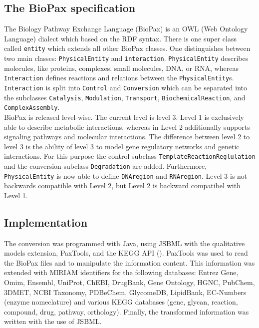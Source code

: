 \documentclass{bioinfo}
\begin{document}
\begin{methods}
\subsection{The BioPax specification}
The Biology Pathway Exchange Language (BioPax) is an OWL (Web Ontology Language) dialect which based on the RDF syntax.
There is one super class called \texttt{entity} which extends all other BioPax classes.
One distinguishes between two main classes: \texttt{PhysicalEntity} and \texttt{interaction}.
\texttt{PhysicalEntity} describes molecules, like proteins, complexes, small molecules, DNA, or RNA, whereas \texttt{Interaction} defines reactions and relations between the \texttt{PhysicalEntity}s.
\texttt{Interaction} is split into \texttt{Control} and \texttt{Conversion} which can be separated into the subclasses \texttt{Catalysis}, \texttt{Modulation}, \texttt{Transport}, \texttt{BiochemicalReaction}, and \texttt{Complex\-Assembly}.\\
BioPax is released level-wise.
The current level is level 3.
Level 1 is exclusively able to describe metabolic interactions, whereas in Level 2 additionally supports signaling pathways and molecular interactions.
The difference between level 2 to level 3 is the ability of level 3 to model gene regulatory networks and genetic interactions.
For this purpose the control subclass \texttt{TemplateReactionReglulation} and the conversion subclass \texttt{Degradation} are added.
Furthermore, \texttt{PhysicalEntity} is now able to define \texttt{DNAregion} and \texttt{RNAregion}.
Level 3 is not backwards compatible with Level 2, but Level 2 is backward compatibel with Level 1. \citep{Demir2010}
\subsection{Implementation}
The conversion was programmed with Java, using JSBML \citep{Draeger2011} with the qualitative models extension, PaxTools, and the KEGG API (\citep{Kanehisa2006}).
PaxTools was used to read the BioPax files and to manipulate the information content.
This information was extended with MIRIAM identifiers for the following databases: Entrez Gene, Omim, Ensembl, UniProt, ChEBI, DrugBank, Gene Ontology, HGNC, PubChem, 3DMET, NCBI Taxonomy, PDBeChem, GlycomeDB, LipidBank, EC-Numbers (enzyme nomeclature) and various KEGG databases (gene, glycan, reaction, compound, drug, pathway, orthology).
Finally, the transformed information was written with the use of JSBML.\\

\end{methods}
\end{document}
